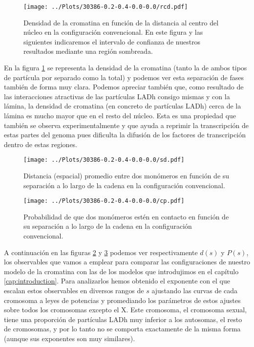 \begin{figure}[t]
    \centering
    \texttt{[image: ../Plots/30386-0.2-0.4-0.0-0.0/rcd.pdf]}
    \caption{Densidad de la cromatina en función de la distancia al centro del núcleo en la configuración convencional. En este figura y las siguientes indicaremos el intervalo de confianza de nuestros resultados mediante una región sombreada.}
    \label{fig:rcd_c}
\end{figure}

En la figura \ref{fig:rcd_c} se representa la densidad de la cromatina (tanto la de ambos tipos de partícula por separado como la total) y podemos ver esta separación de fases también de forma muy clara. Podemos apreciar también que, como resultado de las interacciones atractivas de las partículas LADh consigo mismas y con la lámina, la densidad de cromatina (en concreto de partículas LADh) cerca de la lámina es mucho mayor que en el resto del núcleo. Esta es una propiedad que también se observa experimentalmente y que ayuda a reprimir la transcripción de estas partes del genoma pues dificulta la difusión de los factores de transcripción dentro de estas regiones.

\begin{figure}[p]
    \centering
    \texttt{[image: ../Plots/30386-0.2-0.4-0.0-0.0/sd.pdf]}
    \caption{Distancia (espacial) promedio entre dos monómeros en función de su separación a lo largo de la cadena en la configuración convencional.}
    \label{fig:sd_c}
\end{figure}

\begin{figure}[p]
    \centering
    \texttt{[image: ../Plots/30386-0.2-0.4-0.0-0.0/cp.pdf]}
    \caption{Probabilidad de que dos monómeros estén en contacto en función de su separación a lo largo de la cadena en la configuración convencional.}
    \label{fig:cp_c}
\end{figure}

A continuación en las figuras \ref{fig:sd_c} y \ref{fig:cp_c} podemos ver respectivamente $d(s)$ y $P(s)$, los observables que vamos a emplear para comparar las configuraciones de nuestro modelo de la cromatina con las de los modelos que introdujimos en el capítulo \ref{cap:introduction}. Para analizarlos hemos obtenido el exponente con el que escalan estos observables en diversos rangos de $s$ ajustando las curvas de cada cromosoma a leyes de potencias y promediando los parámetros de estos ajustes sobre todos los cromosomas excepto el X. Este cromosoma, el cromosoma sexual, tiene una proporción de partículas LADh muy inferior a los autosomas, el resto de cromosomas, y por lo tanto no se comporta exactamente de la misma forma (aunque sus exponentes son muy similares).

